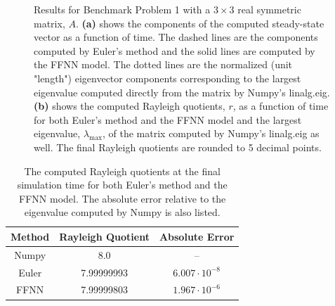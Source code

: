 \begin{figure}[H]
\centering
{}
\qquad
{}
\caption{Results for Benchmark Problem 1 with a $3\times 3$ real symmetric matrix, $A$. \textbf{(a)} shows the components of the computed steady-state vector as a function of time. The dashed lines are the components computed by Euler's method and the solid lines are computed by the FFNN model. The dotted lines are the normalized (unit "length") eigenvector components corresponding to the largest eigenvalue computed directly from the matrix by Numpy's linalg.eig. \textbf{(b)} shows the computed Rayleigh quotients, $r$, as a function of time for both Euler's method and the FFNN model and the largest eigenvalue, $\lambda_\mathrm{max}$, of the matrix computed by Numpy's linalg.eig as well. The final Rayleigh quotients are rounded to 5 decimal points.}
\label{fig:benchrun1}
\end{figure}

\begin{table}[H]
\caption{The computed Rayleigh quotients at the final simulation time for both Euler's method and the FFNN model. The absolute error relative to the eigenvalue computed by Numpy is also listed.}
\centering
{}
\begin{tabular}{c|c|c}
\hline
\hline 
Method & Rayleigh Quotient & Absolute Error
\\
\hline 
\hline 
Numpy & 8.0 & –
\\
Euler & 7.99999993 & $6.007 \cdot 10^{-8}$  
\\
FFNN & 7.99999803 & $1.967 \cdot 10^{-6}$
\\
\hline
\hline 
\end{tabular}
\label{tab:eigbench1}
\end{table}


